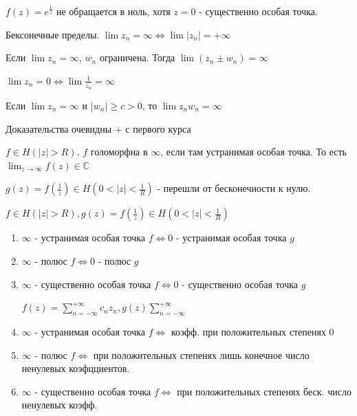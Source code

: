 \begin{example}
    $f(z) = e^{\frac{1}{z}}$ не обращается в ноль, хотя $z = 0$ - существенно особая точка.
\end{example}

\begin{definition}
    Бексонечные пределы. $\lim z_n = \infty \Longleftrightarrow \lim |z_n| = +\infty$
\end{definition}

\begin{properties}

    \item Если $\lim z_n = \infty$, $w_n$ ограничена. Тогда $\lim (z_n \pm w_n) = \infty$
    \item $\lim z_n = 0 \Longleftrightarrow \lim \frac{1}{z_n} = \infty$
    \item Если $\lim z_n = \infty$ и $|w_n| \geqslant c > 0$, то $\lim z_nw_n = \infty$

    Доказательства очевидны + с первого курса
\end{properties}

\begin{definition}
    $f \in H(|z| > R)$. $f$ голоморфна в $\infty$, если там устранимая особая точка. То есть $\lim_{z \to \infty} f(z) \in \mathbb{C}$

    \begin{remark}
        $g(z) = f(\frac{1}{z}) \in H(0 < |z| < \frac{1}{R})$ - перешли от бесконечности к нулю.
    \end{remark}
\end{definition}

\begin{remark}
    $f \in H(|z| > R), g(z) = f(\frac{1}{z}) \in H(0 < |z| < \frac{1}{R})$
    \begin{enumerate}
        \item $\infty$ - устранимая особая точка $f \Longleftrightarrow 0$ - устранимая особая точка $g$
        \item $\infty$ - полюс $f \Longleftrightarrow 0$ - полюс $g$
        \item $\infty$ - существенно особая точка $f \Longleftrightarrow 0$ - существенно особая точка $g$

        $f(z) = \sum_{n = -\infty}^{+\infty} c_nz_n, g(z) \sum_{n = -\infty}^{+\infty}$
        \item $\infty$ - устранимая особая точка $f \Longleftrightarrow$ коэфф. при положительных степенях $0$
        \item $\infty$ - полюс $f \Longleftrightarrow$ при положительных степенях лишь конечное число ненулевых коэфцциентов.
        \item $\infty$ - существенно особая точка $f \Longleftrightarrow$ при положительных степенях беск. число ненулевых коэфф.
    \end{enumerate}
\end{remark}

